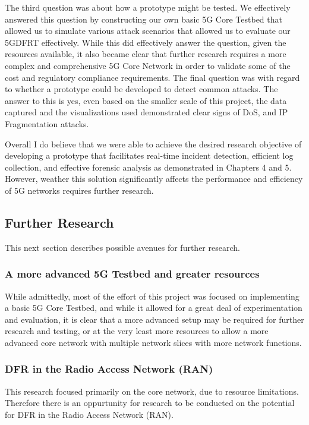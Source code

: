 \documentclass[final,1p,times,authoryear]{elsarticle}
\begin{document}
\vspace{1em}

The third question was about how a prototype might be tested. We effectively answered this question by constructing our own basic 5G Core Testbed that allowed us to simulate various attack scenarios that allowed us to evaluate our 5GDFRT effectively. While this did effectively answer the question, given the resources available, it also became clear that further research requires a more complex and comprehensive 5G Core Network in order to validate some of the cost and regulatory compliance requirements. The final question was with regard to whether a prototype could be developed to detect common attacks. The answer to this is yes, even based on the smaller scale of this project, the data captured and the visualizations used demonstrated clear signs of DoS, and IP Fragmentation attacks.

\vspace{1em}

Overall I do believe that we were able to achieve the desired research objective of developing a prototype that facilitates real-time incident detection, efficient log collection, and effective forensic analysis as demonstrated in Chapters 4 and 5. However, weather this solution significantly affects the performance and efficiency of 5G networks requires further research.

\subsection{Further Research}
\label{sub6sec2}
This next section describes possible avenues for further research.

\subsubsection{A more advanced 5G Testbed and greater resources}
\label{sub6sub2sec1}
While admittedly, most of the effort of this project was focused on implementing a basic 5G Core Testbed, and while it allowed for a great deal of experimentation and evaluation, it is clear that a more advanced setup may be required for further research and testing, or at the very least more resources to allow a more advanced core network with multiple network slices with more network functions.

\subsubsection{DFR in the Radio Access Network (RAN)}
\label{sub6sub2sec2}
This research focused primarily on the core network, due to resource limitations. Therefore there is an oppurtunity for research to be conducted  on the potential for DFR in the Radio Access Network (RAN).
\end{document}
